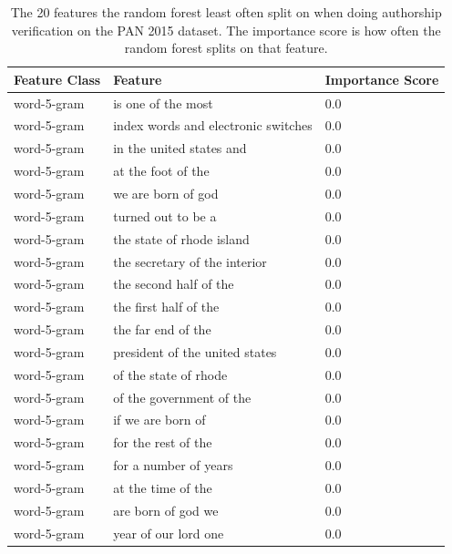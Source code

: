 \begin{table}
    \centering
    \begin{tabular}{lll}
        \textbf{Feature Class} & \textbf{Feature} & \textbf{Importance Score} \\
        \hline
        word-5-gram & is one of the most                  & 0.0 \\
        word-5-gram & index words and electronic switches & 0.0 \\
        word-5-gram & in the united states and            & 0.0 \\
        word-5-gram & at the foot of the                  & 0.0 \\
        word-5-gram & we are born of god                  & 0.0 \\
        word-5-gram & turned out to be a                  & 0.0 \\
        word-5-gram & the state of rhode island           & 0.0 \\
        word-5-gram & the secretary of the interior       & 0.0 \\
        word-5-gram & the second half of the              & 0.0 \\
        word-5-gram & the first half of the               & 0.0 \\
        word-5-gram & the far end of the                  & 0.0 \\
        word-5-gram & president of the united states      & 0.0 \\
        word-5-gram & of the state of rhode               & 0.0 \\
        word-5-gram & of the government of the            & 0.0 \\
        word-5-gram & if we are born of                   & 0.0 \\
        word-5-gram & for the rest of the                 & 0.0 \\
        word-5-gram & for a number of years               & 0.0 \\
        word-5-gram & at the time of the                  & 0.0 \\
        word-5-gram & are born of god we                  & 0.0 \\
        word-5-gram & year of our lord one                & 0.0
    \end{tabular}
    \caption{The 20 features the random forest least often split on when doing
    authorship verification on the PAN 2015 dataset. The importance score is how
    often the random forest splits on that feature.}
    \label{tab:feature_non_importance}
\end{table}

